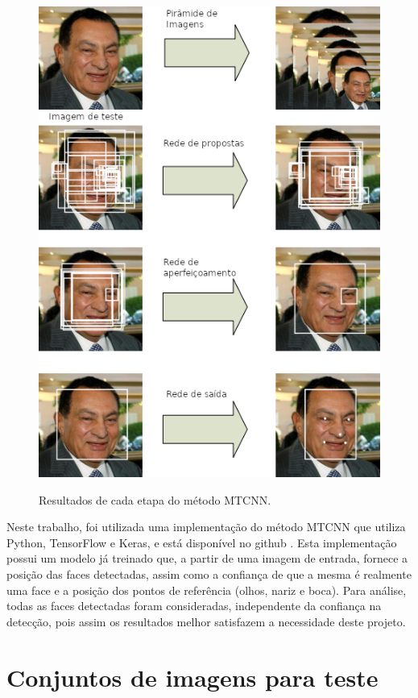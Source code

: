 \begin{figure}[htb]
    \centering
    \caption{Resultados de cada etapa do método MTCNN.}
    \includegraphics[scale=.8]{figs/mtcnn.png}
    \label{fig:mtcnn}
\end{figure}

Neste trabalho, foi utilizada uma implementação do método MTCNN que utiliza Python, TensorFlow e Keras, e está disponível no github \cite{mtcnn_github}. Esta implementação possui um modelo já treinado que, a partir de uma imagem de entrada, fornece a posição das faces detectadas, assim como a confiança de que a mesma é realmente uma face e a posição dos pontos de referência (olhos, nariz e boca). Para análise, todas as faces detectadas foram consideradas, independente da confiança na detecção, pois assim os resultados melhor satisfazem a necessidade deste projeto.

\section{Conjuntos de imagens para teste}

